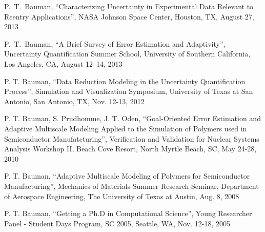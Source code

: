 P.~T.~Bauman,
``Characterizing Uncertainty in Experimental Data Relevant to Reentry Applications'',
NASA Johnson Space Center, Houston, TX, August 27, 2013

\blankline

P.~T.~Bauman,
``A Brief Survey of Error Estimation and Adaptivity'',
Uncertainty Quantification Summer School,
University of Southern California, Los Angeles, CA, August 12--14, 2013

\blankline

P. T. Bauman,
``Data Reduction Modeling in the Uncertainty Quantification Process'',
Simulation and Visualization Symposium, University of Texas at San Antonio, San Antonio, TX, Nov. 12-13, 2012

\blankline

P. T. Bauman, S. Prudhomme, J. T. Oden,
``Goal-Oriented Error Estimation and Adaptive Multiscale Modeling Applied to the Simulation of Polymers used in Semiconductor Manufatcturing'',
Verification and Validation for Nuclear Systems Analysis Workshop II,
Beach Cove Resort, North Myrtle Beach, SC, May 24-28, 2010

\blankline

P. T. Bauman,
``Adaptive Multiscale Modeling of Polymers for Semiconductor Manufacturing'',
Mechanics of Materials Summer Research Seminar,
Department of Aerospace Engineering, The University of Texas at Austin, Aug. 8, 2008

\blankline

P. T. Bauman,
``Getting a Ph.D in Computational Science'',
Young Researcher Panel - Student Days Program, SC 2005, Seattle, WA, Nov. 12-18, 2005 
